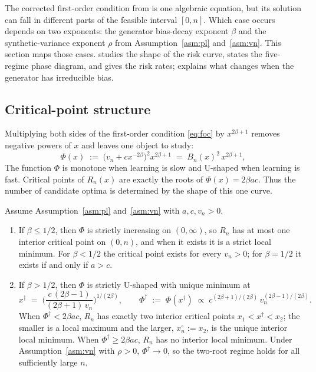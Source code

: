 \label{sec:phase}

The corrected first-order condition from  is one algebraic equation, but its solution can fall in different parts of the feasible interval $[0,n]$. Which case occurs depends on two exponents: the generator bias-decay exponent $\beta$ and the synthetic-variance exponent $\rho$ from Assumption~\ref{asm:pl} and~\ref{asm:vn}. This section maps those cases.  studies the shape of the risk curve,  states the five-regime phase diagram, and  gives the risk rates;  explains what changes when the generator has irreducible bias.

\subsection{Critical-point structure}\label{ssec:critical}

Multiplying both sides of the first-order condition \cref{eq:foc} by $x^{2\beta+1}$ removes negative powers of $x$ and leaves one object to study:
\begin{equation}\label{eq:Phi-def}
  \Phi(x)\;:=\;\bigl(v_n+cx^{-2\beta}\bigr)^2 x^{2\beta+1}\;=\;B_n(x)^2\,x^{2\beta+1},
\end{equation}
The function $\Phi$ is monotone when learning is slow and U-shaped when learning is fast. Critical points of $R_n(x)$ are exactly the roots of $\Phi(x)=2\beta a c$. Thus the number of candidate optima is determined by the shape of this one curve.

\begin{lemma}\label{lem:critical}
Assume Assumption~\ref{asm:pl} and~\ref{asm:vn} with $a, c, v_n>0$.
\begin{enumerate}[label=\rm(\roman*),leftmargin=*]
\item If $\beta\le 1/2$, then $\Phi$ is strictly increasing on $(0,\infty)$, so $R_n$ has at most one interior critical point on $(0,n)$, and when it exists it is a strict local minimum. For $\beta<1/2$ the critical point exists for every $v_n>0$; for $\beta=1/2$ it exists if and only if $a>c$.
\item If $\beta>1/2$, then $\Phi$ is strictly U-shaped with unique minimum at
  \begin{equation}\label{eq:xdagger}
    x^\dagger\;=\;\biggl(\frac{c\,(2\beta-1)}{(2\beta+1)\,v_n}\biggr)^{1/(2\beta)},\qquad \Phi^\dagger\;:=\;\Phi(x^\dagger)\;\propto\;c^{(2\beta+1)/(2\beta)}\,v_n^{(2\beta-1)/(2\beta)}.
  \end{equation}
When $\Phi^\dagger<2\beta a c$, $R_n$ has exactly two interior critical points $x_1<x^\dagger<x_2$; the smaller is a local maximum and the larger, $x_n^\circ:=x_2$, is the unique interior local minimum. When $\Phi^\dagger\ge 2\beta a c$, $R_n$ has no interior local minimum. Under Assumption~\ref{asm:vn} with $\rho>0$, $\Phi^\dagger\to 0$, so the two-root regime holds for all sufficiently large $n$.
\end{enumerate}
\end{lemma}


